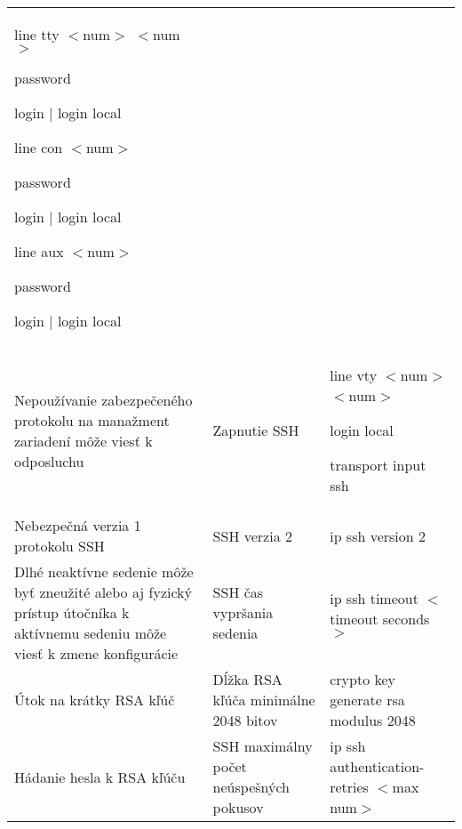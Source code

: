 \begin{longtable}[!htbp]{|L{10em}L{10em}L{34em}|}
	\vspace{0.5em}line tty $<$num$>$ $<$num$>$
	
	\hspace{0.5em}password
	
	\hspace{0.5em}login | login local
	
	\vspace{0.5em}
	line con $<$num$>$
	
	\hspace{0.5em}password
	
	\hspace{0.5em}login | login local
	
	\vspace{0.5em}line aux $<$num$>$
	
	\hspace{0.5em}password

	\hspace{0.5em}login | login local\\
	
	
	
	
	Nepoužívanie zabezpečeného protokolu na manažment zariadení môže viesť k odposluchu	&Zapnutie SSH	&line vty $<$num$>$ $<$num$>$
	
	\hspace{0.5em}login local

	\hspace{0.5em}transport input ssh\\
	
	
	
	Nebezpečná verzia 1 protokolu SSH	&SSH verzia 2	&ip ssh version 2\\
	
	
	
	
	Dlhé neaktívne sedenie môže byť zneužité alebo aj fyzický prístup útočníka k aktívnemu sedeniu môže viesť k zmene konfigurácie	&SSH čas vypršania sedenia	&ip ssh timeout $<$timeout seconds$>$\\
	
	
	
	
	Útok na krátky RSA kľúč	&Dĺžka RSA kľúča minimálne 2048 bitov	&crypto key generate rsa modulus 2048\\
	
	
	
	
	Hádanie hesla k RSA kľúču	&SSH maximálny počet neúspešných pokusov	&ip 
	ssh authentication-retries $<$max num$>$\\
	

\end{longtable}
